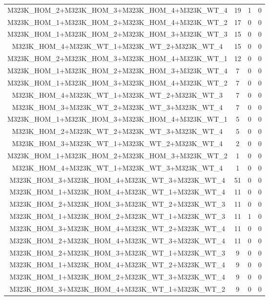 \begin{table}[!htbp]
\begin{tabular}{@{\extracolsep{5pt}} cccc}
		M323K\_HOM\_2+M323K\_HOM\_3+M323K\_HOM\_4+M323K\_WT\_4 & 19 & 1 & 0 \\ 
		M323K\_HOM\_1+M323K\_HOM\_2+M323K\_HOM\_4+M323K\_WT\_2 & 17 & 0 & 0 \\ 
		M323K\_HOM\_1+M323K\_HOM\_2+M323K\_HOM\_3+M323K\_WT\_3 & 15 & 0 & 0 \\ 
		M323K\_HOM\_4+M323K\_WT\_1+M323K\_WT\_2+M323K\_WT\_4 & 15 & 0 & 0 \\ 
		M323K\_HOM\_2+M323K\_HOM\_3+M323K\_HOM\_4+M323K\_WT\_1 & 12 & 0 & 0 \\ 
		M323K\_HOM\_1+M323K\_HOM\_2+M323K\_HOM\_3+M323K\_WT\_4 & 7 & 0 & 0 \\ 
		M323K\_HOM\_1+M323K\_HOM\_3+M323K\_HOM\_4+M323K\_WT\_2 & 7 & 0 & 0 \\ 
		M323K\_HOM\_4+M323K\_WT\_1+M323K\_WT\_2+M323K\_WT\_3 & 7 & 0 & 0 \\ 
		M323K\_HOM\_3+M323K\_WT\_2+M323K\_WT\_3+M323K\_WT\_4 & 7 & 0 & 0 \\ 
		M323K\_HOM\_1+M323K\_HOM\_3+M323K\_HOM\_4+M323K\_WT\_1 & 5 & 0 & 0 \\ 
		M323K\_HOM\_2+M323K\_WT\_2+M323K\_WT\_3+M323K\_WT\_4 & 5 & 0 & 0 \\ 
		M323K\_HOM\_3+M323K\_WT\_1+M323K\_WT\_2+M323K\_WT\_4 & 2 & 0 & 0 \\ 
		M323K\_HOM\_1+M323K\_HOM\_2+M323K\_HOM\_3+M323K\_WT\_2 & 1 & 0 & 0 \\ 
		M323K\_HOM\_4+M323K\_WT\_1+M323K\_WT\_3+M323K\_WT\_4 & 1 & 0 & 0 \\ 
		M323K\_HOM\_3+M323K\_HOM\_4+M323K\_WT\_3+M323K\_WT\_4 & 51 & 0 & 0 \\ 
		M323K\_HOM\_1+M323K\_HOM\_4+M323K\_WT\_1+M323K\_WT\_4 & 11 & 0 & 0 \\ 
		M323K\_HOM\_2+M323K\_HOM\_3+M323K\_WT\_2+M323K\_WT\_3 & 11 & 0 & 0 \\ 
		M323K\_HOM\_1+M323K\_HOM\_2+M323K\_WT\_1+M323K\_WT\_3 & 11 & 1 & 0 \\ 
		M323K\_HOM\_3+M323K\_HOM\_4+M323K\_WT\_2+M323K\_WT\_4 & 11 & 0 & 0 \\ 
		M323K\_HOM\_2+M323K\_HOM\_4+M323K\_WT\_3+M323K\_WT\_4 & 11 & 0 & 0 \\ 
		M323K\_HOM\_2+M323K\_HOM\_3+M323K\_WT\_1+M323K\_WT\_3 & 9 & 0 & 0 \\ 
		M323K\_HOM\_1+M323K\_HOM\_4+M323K\_WT\_2+M323K\_WT\_4 & 9 & 0 & 0 \\ 
		M323K\_HOM\_1+M323K\_HOM\_2+M323K\_WT\_3+M323K\_WT\_4 & 9 & 0 & 0 \\ 
		M323K\_HOM\_3+M323K\_HOM\_4+M323K\_WT\_1+M323K\_WT\_2 & 9 & 0 & 0 \\ 

\end{tabular}
\end{table}
